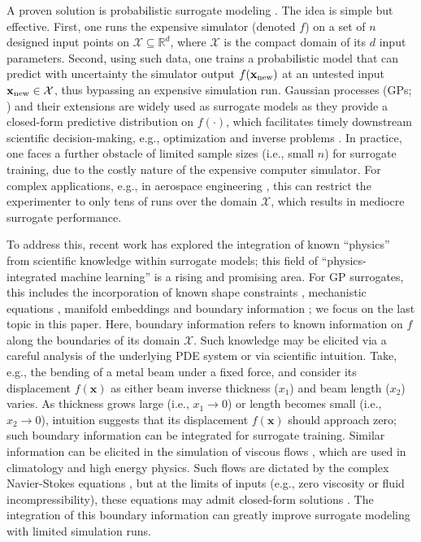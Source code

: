 \documentclass[aos,preprint]{imsart}
\theoremstyle{plain}
\theoremstyle{remark}
\begin{document}
A proven solution is probabilistic surrogate modeling \citep{gramacy2020surrogates}. The idea is simple but effective. First, one runs the expensive simulator (denoted $f$) on a set of $n$ designed input points on $\mathcal{X} \subseteq \mathbb{R}^d$, where $\mathcal{X}$ is the compact domain of its $d$ input parameters. Second, using such data, one trains a probabilistic model that can predict with uncertainty the simulator output $f(\mathbf{x}_{\rm new})$ at an untested input $\mathbf{x}_{\rm new} \in \mathcal{X}$, thus bypassing an expensive simulation run. Gaussian processes (GPs; \citep{gramacy2020surrogates}) and their extensions are widely used as surrogate models as they provide a closed-form predictive distribution on $f(\cdot)$, which facilitates timely downstream scientific decision-making, e.g., optimization \citep{chen2024hierarchical} and inverse problems \citep{ehlers2024bayesian}. In practice, one faces a further obstacle of limited sample sizes (i.e., small $n$) for surrogate training, due to the costly nature of the expensive computer simulator. For complex applications, e.g., in aerospace engineering \citep{narayanan2024misfire}, this can restrict the experimenter to only tens of runs over the domain $\mathcal{X}$, which results in mediocre surrogate performance.

To address this, recent work has explored the integration of known ``physics'' from scientific knowledge within surrogate models; this field of ``physics-integrated machine learning'' \citep{willard2020integrating} is a rising and promising area. For GP surrogates, this includes the incorporation of known shape constraints \citep{WangBerger16,Golchi15}, mechanistic equations \citep{Wheeler14}, manifold embeddings \citep{li2023additive,seshadri2019dimension} and boundary information \citep{tan2018gaussian,vernon2019known,jackson2023efficient,ding2019bdrygp}; we focus on the last topic in this paper. Here, boundary information refers to known information on $f$ along the boundaries of its domain $\mathcal{X}$. Such knowledge may be elicited via a careful analysis of the underlying PDE system or via scientific intuition. Take, e.g., the bending of a metal beam under a fixed force, and consider its displacement $f(\mathbf{x})$ as either beam inverse thickness ($x_1$) and beam length ($x_2$) varies. As thickness grows large (i.e., $x_1 \rightarrow 0$) or length becomes small (i.e., $x_2 \rightarrow 0$), intuition suggests that its displacement $f(\mathbf{x})$ should approach zero; such boundary information can be integrated for surrogate training. Similar information can be elicited in the simulation of viscous flows \cite{white2006viscous}, which are used in climatology and high energy physics. Such flows are dictated by the complex Navier-Stokes equations \cite{temam2001navier}, but at the limits of inputs (e.g., zero viscosity or fluid incompressibility), these equations may admit closed-form solutions \cite{kiehn2001some,humphrey2016introduction}. The integration of this boundary information can greatly improve surrogate modeling with limited simulation runs.
\end{document}
